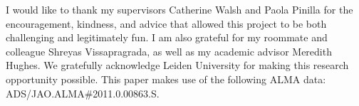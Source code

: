 \documentclass{knac}
\begin{document}

\acknowledgments

I would like to thank my supervisors Catherine Walsh and Paola Pinilla for the encouragement, kindness, and advice that allowed this project to be both challenging and legitimately fun. I am also grateful for my roommate and colleague Shreyas Vissapragrada, as well as my academic advisor Meredith Hughes.
We gratefully acknowledge Leiden University for making this research opportunity possible. This paper makes use of the following ALMA data: ADS/JAO.ALMA\#2011.0.00863.S.










\end{document}

